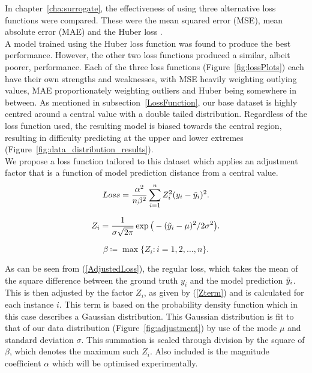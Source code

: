In chapter~\ref{cha:surrogate}, the effectiveness of using three alternative loss functions were compared. These were the mean squared error (MSE), mean absolute error (MAE) and the Huber loss \cite{huber1964robust}.
\\

\noindent
A model trained using the Huber loss function was found to produce the best performance. However, the other two loss functions produced a similar, albeit poorer, performance. Each of the three loss functions (Figure~\ref{fig:lossPlots}) each have their own strengths and weaknesses, with MSE heavily weighting outlying values, MAE proportionately weighting outliers and Huber being somewhere in between. As mentioned in subsection~\ref{LossFunction}, our base dataset is highly centred around a central value with a double tailed distribution. Regardless of the loss function used, the resulting model is biased towards the central region, resulting in difficulty predicting at the upper and lower extremes (Figure~\ref{fig:data_distribution_results}). 
\\

\noindent
We propose a loss function tailored to this dataset which applies an adjustment factor that is a function of model prediction distance from a central value.
\\

\begin{equation}
	Loss = \frac{\alpha^{2}}{n\beta^{2}} \sum_{i=1}^{n} Z_i^{2}(y_i - \Tilde{y}_i)^2.
	\label{AdjustedLoss}
\end{equation}

\begin{equation}
	Z_i =\frac{1}{\sigma \sqrt{2\pi}} \exp\big(-(\Tilde{y}_i - \mu)^{2}/2\sigma^2\big).
	\label{Zterm}
\end{equation}

\begin{equation}
	\beta \coloneqq \max\{Z_{i}: i=1, 2, \ldots, n\}.
	\label{b}
\end{equation}

\noindent
As can be seen from (\ref{AdjustedLoss}), the regular loss, which takes the mean of the square difference between the ground truth $y_i$ and the model prediction $\Tilde{y}_i$. This is then adjusted by the factor $Z_i$, as given by (\ref{Zterm}) and is calculated for each instance $i$. This term is based on the probability density function which in this case describes a Gaussian distribution. This Gaussian distribution is fit to that of our data distribution (Figure~\ref{fig:adjustment}) by use of the mode $\mu$ and standard deviation $\sigma$. This summation is scaled through division by the square of $\beta$, which denotes the maximum such $Z_i$. Also included is the magnitude coefficient $\alpha$ which will be optimised experimentally.
\\

